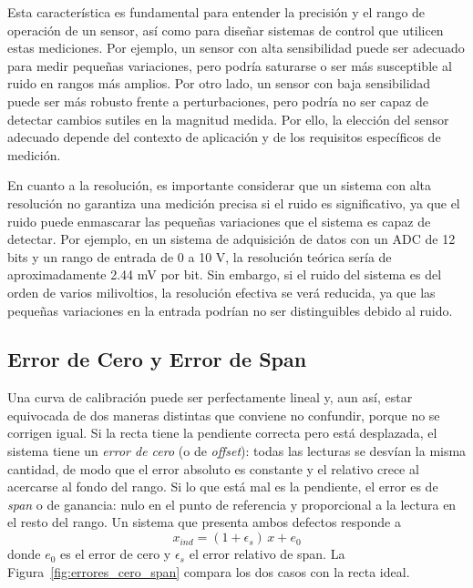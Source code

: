 Esta característica es fundamental para entender la precisión y el rango de operación de un sensor, así como para diseñar sistemas de control que utilicen estas mediciones. Por ejemplo, un sensor con alta sensibilidad puede ser adecuado para medir pequeñas variaciones, pero podría saturarse o ser más susceptible al ruido en rangos más amplios. Por otro lado, un sensor con baja sensibilidad puede ser más robusto frente a perturbaciones, pero podría no ser capaz de detectar cambios sutiles en la magnitud medida. Por ello, la elección del sensor adecuado depende del contexto de aplicación y de los requisitos específicos de medición.

En cuanto a la resolución, es importante considerar que un sistema con alta resolución no garantiza una medición precisa si el ruido es significativo, ya que el ruido puede enmascarar las pequeñas variaciones que el sistema es capaz de detectar. Por ejemplo, en un sistema de adquisición de datos con un ADC de 12 bits y un rango de entrada de 0 a 10 V, la resolución teórica sería de aproximadamente 2.44 mV por bit. Sin embargo, si el ruido del sistema es del orden de varios milivoltios, la resolución efectiva se verá reducida, ya que las pequeñas variaciones en la entrada podrían no ser distinguibles debido al ruido.

\subsection{Error de Cero y Error de Span}\label{sub:error_cero_span}

Una curva de calibración puede ser perfectamente lineal y, aun así, estar equivocada de dos maneras distintas que conviene no confundir, porque no se corrigen igual. Si la recta tiene la pendiente correcta pero está desplazada, el sistema tiene un \emph{error de cero} (o de \emph{offset}): todas las lecturas se desvían la misma cantidad, de modo que el error absoluto es constante y el relativo crece al acercarse al fondo del rango. Si lo que está mal es la pendiente, el error es de \emph{span} o de ganancia: nulo en el punto de referencia y proporcional a la lectura en el resto del rango. Un sistema que presenta ambos defectos responde a
\begin{equation}\label{eq:error_cero_span}
    x_{ind} = (1 + \epsilon_s)\,x + e_0
\end{equation}
donde $e_0$ es el error de cero y $\epsilon_s$ el error relativo de span. La Figura~\ref{fig:errores_cero_span} compara los dos casos con la recta ideal.


